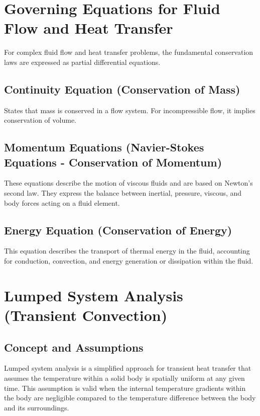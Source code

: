 \section{Governing Equations for Fluid Flow and Heat Transfer}
For complex fluid flow and heat transfer problems, the fundamental conservation laws are expressed as partial differential equations.

\subsection{Continuity Equation (Conservation of Mass)}
States that mass is conserved in a flow system. For incompressible flow, it implies conservation of volume.

\subsection{Momentum Equations (Navier-Stokes Equations - Conservation of Momentum)}
These equations describe the motion of viscous fluids and are based on Newton's second law. They express the balance between inertial, pressure, viscous, and body forces acting on a fluid element.

\subsection{Energy Equation (Conservation of Energy)}
This equation describes the transport of thermal energy in the fluid, accounting for conduction, convection, and energy generation or dissipation within the fluid.

\section{Lumped System Analysis (Transient Convection)}
\subsection{Concept and Assumptions}
Lumped system analysis is a simplified approach for transient heat transfer that assumes the temperature within a solid body is spatially uniform at any given time. This assumption is valid when the internal temperature gradients within the body are negligible compared to the temperature difference between the body and its surroundings.

